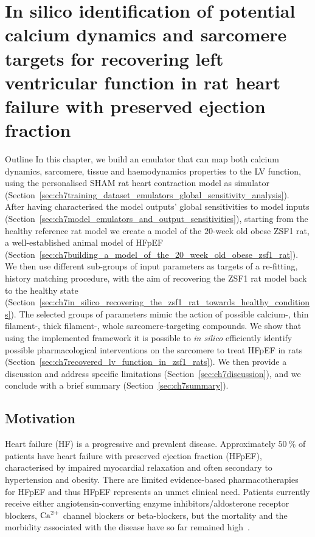 \chapter{In silico identification of potential calcium dynamics and sarcomere targets for recovering left ventricular function in rat heart failure with preserved ejection fraction}\label{cha:chapter7}
%
%
%
\begin{remark}{Outline}
    In this chapter, we build an emulator that can map both calcium dynamics, sarcomere, tissue and haemodynamics properties to the LV function, using the personalised SHAM rat heart contraction model as simulator (Section~\ref{sec:ch7training_dataset_emulators_global_sensitivity_analysis}). After having characterised the model outputs' global sensitivities to model inputs (Section~\ref{sec:ch7model_emulators_and_output_sensitivities}), starting from the healthy reference rat model we create a model of the $20$-week old obese ZSF1 rat, a well-established animal model of HFpEF (Section~\ref{sec:ch7building_a_model_of_the_20_week_old_obese_zsf1_rat}). We then use different sub-groups of input parameters as targets of a re-fitting, history matching procedure, with the aim of recovering the ZSF1 rat model back to the healthy state (Section~\ref{sec:ch7in_silico_recovering_the_zsf1_rat_towards_healthy_conditions}). The selected groups of parameters mimic the action of possible calcium-, thin filament-, thick filament-, whole sarcomere-targeting compounds. We show that using the implemented framework it is possible to \textit{in silico} efficiently identify possible pharmacological interventions on the sarcomere to treat HFpEF in rats (Section~\ref{sec:ch7recovered_lv_function_in_zsf1_rats}). We then provide a discussion and address specific limitations (Section~\ref{sec:ch7discussion}), and we conclude with a brief summary (Section~\ref{sec:ch7summary}).
\end{remark}


%
%
%
\section{Motivation}\label{sec:ch7motivation}
Heart failure (HF) is a progressive and prevalent disease. Approximately $\SI{50}{\percent}$ of patients have heart failure with preserved ejection fraction (HFpEF), characterised by impaired myocardial relaxation and often secondary to hypertension and obesity. There are limited evidence-based pharmacotherapies for HFpEF and thus HFpEF represents an unmet clinical need. Patients currently receive either angiotensin-converting enzyme inhibitors/aldosterone receptor blockers, $\textrm{Ca}^{2+}$ channel blockers or beta-blockers, but the mortality and the morbidity associated with the disease have so far remained high~\cite{Adamczak:2020}.

